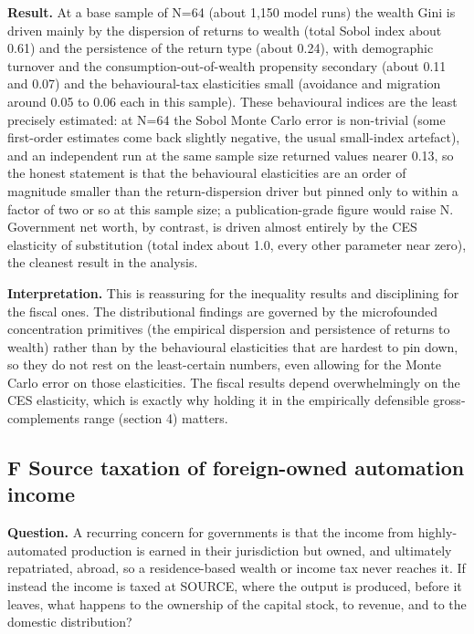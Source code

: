 \documentclass[11pt]{article}
\begin{document}
\textbf{Result.} At a base sample of N=64 (about 1,150 model runs) the
wealth Gini is driven mainly by the dispersion of returns to wealth
(total Sobol index about 0.61) and the persistence of the return type
(about 0.24), with demographic turnover and the
consumption-out-of-wealth propensity secondary (about 0.11 and 0.07) and
the behavioural-tax elasticities small (avoidance and migration around
0.05 to 0.06 each in this sample). These behavioural indices are the
least precisely estimated: at N=64 the Sobol Monte Carlo error is
non-trivial (some first-order estimates come back slightly negative, the
usual small-index artefact), and an independent run at the same sample
size returned values nearer 0.13, so the honest statement is that the
behavioural elasticities are an order of magnitude smaller than the
return-dispersion driver but pinned only to within a factor of two or so
at this sample size; a publication-grade figure would raise N.
Government net worth, by contrast, is driven almost entirely by the CES
elasticity of substitution (total index about 1.0, every other parameter
near zero), the cleanest result in the analysis.

\textbf{Interpretation.} This is reassuring for the inequality results
and disciplining for the fiscal ones. The distributional findings are
governed by the microfounded concentration primitives (the empirical
dispersion and persistence of returns to wealth) rather than by the
behavioural elasticities that are hardest to pin down, so they do not
rest on the least-certain numbers, even allowing for the Monte Carlo
error on those elasticities. The fiscal results depend overwhelmingly on
the CES elasticity, which is exactly why holding it in the empirically
defensible gross-complements range (section 4) matters.

\hypertarget{f-source-taxation-of-foreign-owned-automation-income}{%
\subsection{F \textperiodcentered{} Source taxation of foreign-owned automation
income}\label{f-source-taxation-of-foreign-owned-automation-income}}

\textbf{Question.} A recurring concern for governments is that the
income from highly-automated production is earned in their jurisdiction
but owned, and ultimately repatriated, abroad, so a residence-based
wealth or income tax never reaches it. If instead the income is taxed at
SOURCE, where the output is produced, before it leaves, what happens to
the ownership of the capital stock, to revenue, and to the domestic
distribution?
\end{document}
